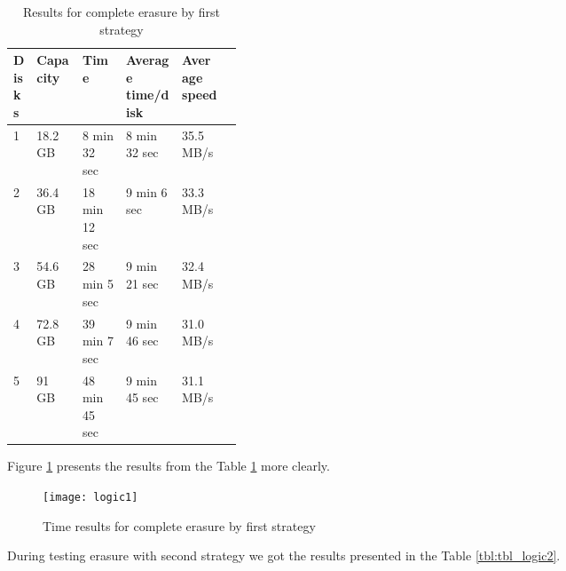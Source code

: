 \begin{table}[h!]
  \caption{Results for complete erasure by first strategy}
  \begin{center}
  \begin{tabularx}{\textwidth}{|p{0.1\linewidth}|p{0.2\linewidth}|X|X|X|X|}
    \hline
    Disks & Capacity & Time & Average time/disk & Average speed
    \\ \hline
    1 & 18.2 GB & 8 min 32 sec  & 8 min 32 sec & 35.5 MB/s \\ \hline    
    2 & 36.4 GB & 18 min 12 sec & 9 min 6 sec  & 33.3 MB/s \\ \hline
    3 & 54.6 GB & 28 min 5 sec  & 9 min 21 sec & 32.4 MB/s \\ \hline
    4 & 72.8 GB & 39 min 7 sec  & 9 min 46 sec & 31.0 MB/s \\ \hline
    5 & 91 GB   & 48 min 45 sec & 9 min 45 sec & 31.1 MB/s \\ \hline
  \end{tabularx}
  \label{tbl:tbl_logic1}
  \end{center}
\end{table}
Figure \ref{fig:logic1} presents the results from the Table \ref{tbl:tbl_logic1} more clearly.
\begin{figure}[h!]
\begin{center}
  \texttt{[image: logic1]}
\end{center}
  \caption{Time results for complete erasure by first strategy}
  \label{fig:logic1}
\end{figure}

\newpage

During testing erasure with second strategy we got the results presented in the Table \ref{tbl:tbl_logic2}. 


